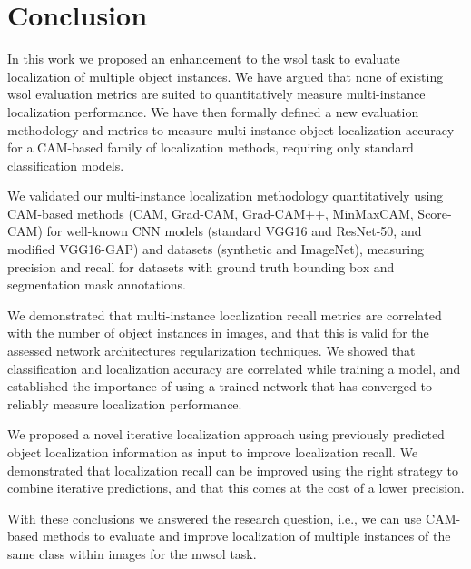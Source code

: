 \chapter{Conclusion} \label{ch:conclusion}

In this work we proposed an enhancement to the \acrlong{wsol} task to evaluate localization of multiple object instances. We have argued that none of existing \acrshort{wsol} evaluation metrics are suited to quantitatively measure multi-instance localization performance. We have then formally defined a new evaluation methodology and metrics to measure multi-instance object localization accuracy for a CAM-based family of localization methods, requiring only standard classification models.

We validated our multi-instance localization methodology quantitatively using CAM-based methods (CAM, Grad-CAM, Grad-CAM++, MinMaxCAM, Score-CAM) for well-known CNN models (standard VGG16 and ResNet-50, and modified VGG16-GAP) and datasets (synthetic and ImageNet), measuring precision and recall for datasets with ground truth bounding box and segmentation mask annotations.

We demonstrated that multi-instance localization recall metrics are correlated with the number of object instances in images, and that this is valid for the assessed network architectures regularization techniques. We showed that classification and localization accuracy are correlated while training a model, and established the importance of using a trained network that has converged to reliably measure localization performance.

We proposed a novel iterative localization approach using previously predicted object localization information as input to improve localization recall. We demonstrated that localization recall can be improved using the right strategy to combine iterative predictions, and that this comes at the cost of a lower precision.

With these conclusions we answered the research question, i.e., we can use CAM-based methods to evaluate and improve localization of multiple instances of the same class within images for the \acrshort{mwsol} task.